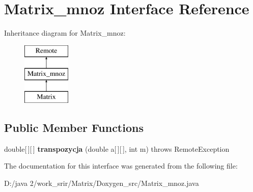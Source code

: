 \hypertarget{interface_matrix__mnoz}{}\section{Matrix\+\_\+mnoz Interface Reference}
\label{interface_matrix__mnoz}
Inheritance diagram for Matrix\+\_\+mnoz\+:\begin{figure}[H]
\begin{center}
\leavevmode
\includegraphics[height=3.000000cm]{interface_matrix__mnoz}
\end{center}
\end{figure}
\subsection*{Public Member Functions}
\begin{DoxyCompactItemize}
\item 
\hypertarget{interface_matrix__mnoz_a6dc3f28e37b1de67d11370eabc219ecd}{}double\mbox{[}$\,$\mbox{]}\mbox{[}$\,$\mbox{]} {\bfseries transpozycja} (double a\mbox{[}$\,$\mbox{]}\mbox{[}$\,$\mbox{]}, int m)  throws Remote\+Exception\label{interface_matrix__mnoz_a6dc3f28e37b1de67d11370eabc219ecd}

\end{DoxyCompactItemize}


The documentation for this interface was generated from the following file\+:\begin{DoxyCompactItemize}
\item 
D\+:/java 2/work\+\_\+srir/\+Matrix/\+Doxygen\+\_\+src/Matrix\+\_\+mnoz.\+java\end{DoxyCompactItemize}
